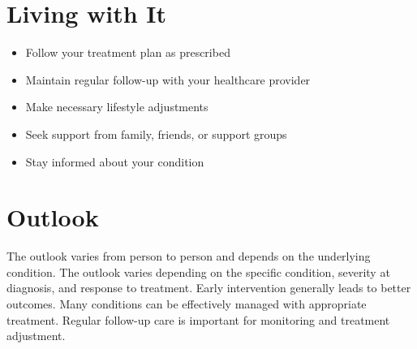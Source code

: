 \section{Living with It}
\begin{itemize}[noitemsep]
  \item Follow your treatment plan as prescribed
  \item Maintain regular follow-up with your healthcare provider
  \item Make necessary lifestyle adjustments
  \item Seek support from family, friends, or support groups
  \item Stay informed about your condition
\end{itemize}
\section{Outlook}
The outlook varies from person to person and depends on the underlying condition. The outlook varies depending on the specific condition, severity at diagnosis, and response to treatment. Early intervention generally leads to better outcomes. Many conditions can be effectively managed with appropriate treatment. Regular follow-up care is important for monitoring and treatment adjustment.

